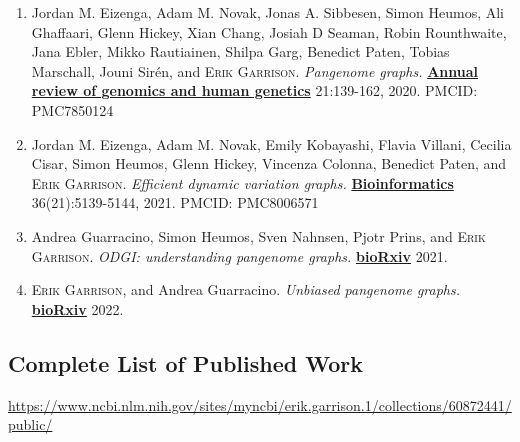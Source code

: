 \documentclass{nihbiosketch}
\newcommand{\hijournal}[1]{{\bf {\uline{#1}}}}
\begin{document}
\begin{enumerate}
  \begin{enumerate}

    \item Jordan M. Eizenga, Adam M. Novak, Jonas A. Sibbesen, Simon Heumos, Ali Ghaffaari, Glenn Hickey, Xian Chang, Josiah D Seaman, Robin Rounthwaite, Jana Ebler, Mikko Rautiainen, Shilpa Garg, Benedict Paten, Tobias Marschall, Jouni Sirén, and \textsc{Erik Garrison}. \emph{Pangenome graphs.} \hijournal{Annual review of genomics and human genetics} 21:139-162, 2020. PMCID: PMC7850124
    
  \item Jordan M. Eizenga, Adam M. Novak, Emily Kobayashi, Flavia Villani, Cecilia Cisar, Simon Heumos, Glenn Hickey, Vincenza Colonna, Benedict Paten, and \textsc{Erik Garrison}. \emph{Efficient dynamic variation graphs.} \hijournal{Bioinformatics} 36(21):5139-5144, 2021. PMCID: PMC8006571
  
  \item Andrea Guarracino, Simon Heumos, Sven Nahnsen, Pjotr Prins, and \textsc{Erik Garrison}. \emph{ODGI: understanding pangenome graphs.} \hijournal{bioRxiv} 2021.
  
  \item \textsc{Erik Garrison}, and Andrea Guarracino. \emph{Unbiased pangenome graphs.} \hijournal{bioRxiv} 2022.
  \end{enumerate}

\end{enumerate}

\subsection*{Complete List of Published Work}

\begin{datetbl}
  \url{https://www.ncbi.nlm.nih.gov/sites/myncbi/erik.garrison.1/collections/60872441/public/}
\end{datetbl}


\end{document}
